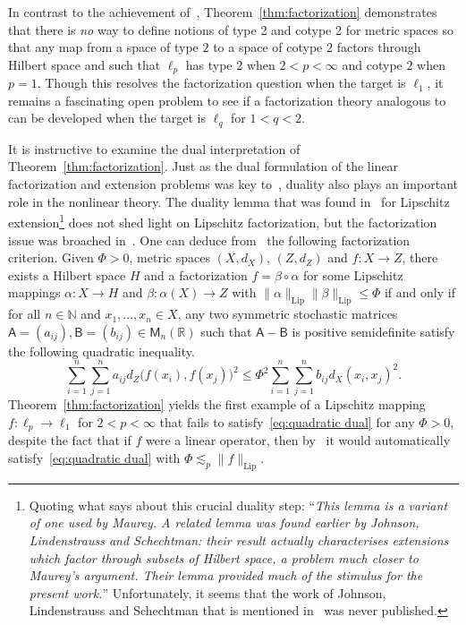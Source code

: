 \documentclass[11pt,reqno]{amsart}
\newcommand{\N}{\mathbb{N}}
\newcommand{\R}{\mathbb{R}}
\newcommand{\0}{\mathbf{0}}
\renewcommand{\1}{\mathbf 1}
\newcommand{\from}{\colon}
\renewcommand{\le}{\leqslant}
\theoremstyle{remark}
\DeclareMathOperator{\Lip}{Lip}
\begin{document}
In contrast to the achievement of~\cite{Bal92}, Theorem~\ref{thm:factorization} demonstrates that there is \emph{no} way to define notions of type 2 and cotype 2 for metric spaces so that any map from a space of type $2$ to a space of cotype $2$ factors through Hilbert space and such that $\ell_p$ has type 2 when $2< p<\infty$ and cotype $2$ when $p=1$.  Though this resolves the factorization question when the target is $\ell_1$, it remains a fascinating open problem to see if a factorization theory analogous to~\cite{Bal92} can be developed when the target is $\ell_q$ for $1<q<2$.

It is instructive to examine the dual interpretation of Theorem~\ref{thm:factorization}. Just as the dual formulation of the linear factorization and extension problems was key to~\cite{Mau74}, duality also plays an important role in the nonlinear theory.  The duality lemma that was found in~\cite{Bal92} for Lipschitz extension\footnote{Quoting what \cite{Bal92} says about this crucial duality step: ``{\em This lemma is a variant of one used by Maurey. A related lemma was
found earlier by Johnson, Lindenstrauss and Schechtman: their result actually characterises extensions which factor through subsets of
Hilbert space, a problem much closer to Maurey's argument. Their lemma provided much of the stimulus for the present work.}'' Unfortunately, it seems that the work of Johnson, Lindenstrauss and Schechtman that is mentioned in~\cite{Bal92} was never published.} does not shed light on Lipschitz factorization, but the factorization issue was broached in~\cite{FJ09,CD14}. One can deduce from~\cite{CD14} the following factorization criterion. Given $\Phi>0$, metric spaces $(X,d_X)$, $(Z,d_Z)$ and $f\from X\to Z$, there exists a Hilbert space $H$ and a factorization $f=\beta\circ \alpha$ for some Lipschitz mappings $\alpha\from X\to H$ and $\beta\from \alpha(X)\to Z$ with $\|\alpha\|_{\Lip}\|\beta\|_{\Lip}\le \Phi$ if and only if
for all $n\in \N$ and $x_1,\ldots,x_n\in X$, any two symmetric stochastic matrices  $\mathsf{A}=(a_{ij}),\mathsf{B}=(b_{ij})\in \mathsf{M}_n(\R)$ such that $\mathsf{A}-\mathsf{B}$ is positive semidefinite satisfy the following quadratic  inequality.
\begin{equation}\label{eq:quadratic dual}
\sum_{i=1}^n\sum_{j=1}^n a_{ij} d_Z\big(f(x_i),f(x_j)\big)^2\le \Phi^2 \sum_{i=1}^n\sum_{j=1}^n b_{ij} d_X(x_i,x_j)^2.
\end{equation}
Theorem~\ref{thm:factorization} yields the first example of a Lipschitz mapping $f\from \ell_p\to \ell_1$ for $2<p<\infty$ that fails to satisfy~\eqref{eq:quadratic dual} for any $\Phi>0$, despite the fact that if $f$ were  a linear operator, then by~\cite{Mau74} it would automatically  satisfy~\eqref{eq:quadratic dual} with $\Phi\lesssim_p \|f\|_{\Lip}$.
\end{document}
